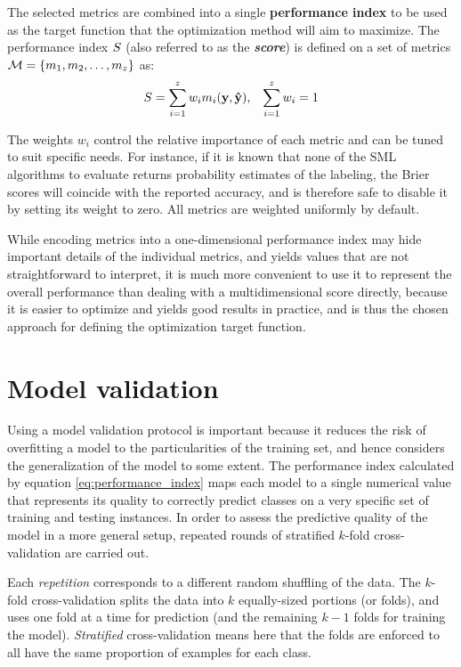 
	The selected metrics are combined into a single {\bf performance index} to be used as the target
	function that the optimization method will aim to maximize. The performance index $S$ (also
	referred to as the {\bf \emph{score}}) is defined on a set of metrics $\mathcal{M} = \{m_1, m_2,
	\ldots, m_z\}$ as:
	\begin{align}
		S &= \sum_{i=1}^z w_i m_i(\mathbf{y}, \mathbf{\hat{y}}), & \sum_{i=1}^z w_i = 1
		\label{eq:performance_index}
	\end{align}

	The weights $w_i$ control the relative importance of each metric and can be tuned to suit
	specific needs. For instance, if it is known that none of the SML algorithms to evaluate returns
	probability estimates of the labeling, the Brier scores will coincide with the reported
	accuracy, and is therefore safe to disable it by setting its weight to zero. All metrics are
	weighted uniformly by default.

	While encoding metrics into a one-dimensional performance index may hide important details of
	the individual metrics, and yields values that are not straightforward to interpret, it is much
	more convenient to use it to represent the overall performance than dealing with a
	multidimensional score directly, because it is easier to optimize and yields good results in
	practice, and is thus the chosen approach for defining the optimization target
	function.

\section{Model validation}
Using a model validation protocol is important because it reduces the risk of overfitting a model to
the particularities of the training set, and hence considers the generalization of the model to some
extent. The performance index calculated by equation \ref{eq:performance_index} maps each model to a single
numerical value that represents its quality to correctly predict classes on a very specific set of training
and testing instances. In order to assess the predictive quality of the model in a more general
setup, repeated rounds of stratified $k$-fold cross-validation are carried out. 

Each \emph{repetition} corresponds to a different random shuffling of the data. The $k$-fold
cross-validation splits the data into $k$ equally-sized portions (or folds), and uses one fold at a
time for prediction (and the remaining $k-1$ folds for training the model). \emph{Stratified} cross-validation
means here that the folds are enforced to all have the same proportion of examples for each class.

